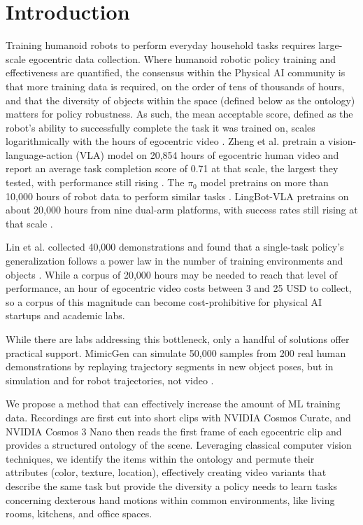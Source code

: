 \documentclass[runningheads]{llncs}
\begin{document}
\section{Introduction}

Training humanoid robots to perform everyday household tasks requires large-scale egocentric data collection. Where humanoid robotic policy training and effectiveness are quantified, the consensus within the Physical AI community is that more training data is required, on the order of tens of thousands of hours, and that the diversity of objects within the space (defined below as the ontology) matters for policy robustness. As such, the mean acceptable score, defined as the robot's ability to successfully complete the task it was trained on, scales logarithmically with the hours of egocentric video \cite{r1}. Zheng et al. pretrain a vision-language-action (VLA) model on 20,854 hours of egocentric human video and report an average task completion score of 0.71 at that scale, the largest they tested, with performance still rising \cite{r1}. The $\pi_0$ model pretrains on more than 10,000 hours of robot data to perform similar tasks \cite{r2}. LingBot-VLA pretrains on about 20,000 hours from nine dual-arm platforms, with success rates still rising at that scale \cite{r3}.

Lin et al. collected 40,000 demonstrations and found that a single-task policy's generalization follows a power law in the number of training environments and objects \cite{r4}. While a corpus of 20,000 hours may be needed to reach that level of performance, an hour of egocentric video costs between 3 and 25 USD to collect, so a corpus of this magnitude can become cost-prohibitive for physical AI startups and academic labs.

While there are labs addressing this bottleneck, only a handful of solutions offer practical support. MimicGen can simulate 50,000 samples from 200 real human demonstrations by replaying trajectory segments in new object poses, but in simulation and for robot trajectories, not video \cite{r5}.

We propose a method that can effectively increase the amount of ML training data. Recordings are first cut into short clips with NVIDIA Cosmos Curate, and NVIDIA Cosmos 3 Nano then reads the first frame of each egocentric clip and provides a structured ontology of the scene. Leveraging classical computer vision techniques, we identify the items within the ontology and permute their attributes (color, texture, location), effectively creating video variants that describe the same task but provide the diversity a policy needs to learn tasks concerning dexterous hand motions within common environments, like living rooms, kitchens, and office spaces.
\end{document}
